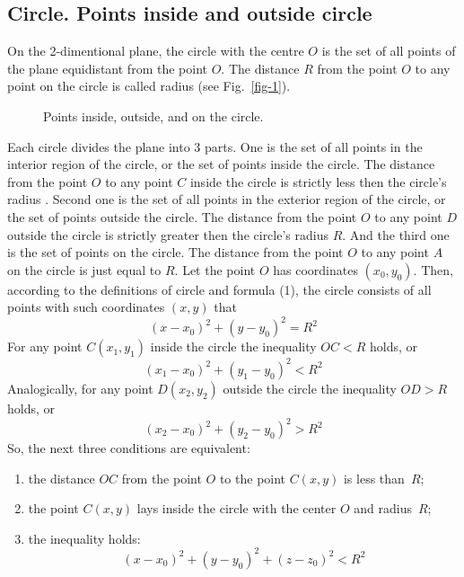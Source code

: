\documentclass{article}
\begin{document}
\subsection{Circle. Points inside and outside circle} %

On the 2-dimentional plane, the circle with the centre $O$ is the set of all points of the plane equidistant from the point $O$.
The distance $R$ from the point $O$ to any point on the circle is called radius (see Fig.~\ref{fig-1}).
\begin{figure}
  \centering
  \def\svgwidth{\columnwidth}
  
\caption{Points inside, outside, and on the circle.}
\label{fig-4}
\end{figure}
%
Each circle divides the plane into 3 parts.
One is the set of all points in the interior region of the circle, or the set of points inside the circle.
The distance from the point $O$ to any point $C$ inside the circle is strictly less then the circle’s radius     .
Second one is the set of all points in the exterior region of the circle, or the set of points outside the circle.
The distance from the point $O$ to any point $D$ outside the circle is strictly greater then the circle’s radius $R$.
And the third one is the set of points on the circle.
The distance from the point $O$ to any point $A$ on the circle is just equal to $R$.
Let the point $O$ has coordinates $(x_0, y_0)$.
Then, according to the definitions of circle and formula (1), the circle consists of all points with such coordinates $(x, y)$ that
\begin{equation}
  (x - x_0)^2 + (y - y_0)^2 = R^2
\end{equation}
For any point $C(x_1, y_1)$ inside the circle the inequality $OC < R$ holds, or
\begin{equation}
  (x_1 - x_0)^2 + (y_1 - y_0)^2 < R^2
\end{equation}
Analogically, for any point $D(x_2, y_2)$ outside the circle the inequality $OD > R$ holds, or
\begin{equation}
  (x_2 - x_0)^2 + (y_2 - y_0)^2 > R^2
\end{equation}
So, the next three conditions are equivalent:
\begin{enumerate}
\item
the distance $OC$ from the point $O$ to the point $C(x, y)$ is less than~$R$;
\item
the point $C(x, y)$ lays inside the circle with the center $O$ and radius~$R$;
\item
the inequality holds:
\begin{equation}
  (x - x_0)^2 + (y - y_0)^2 + (z - z_0)^2 < R^2
\end{equation}
\end{enumerate}
\end{document}
